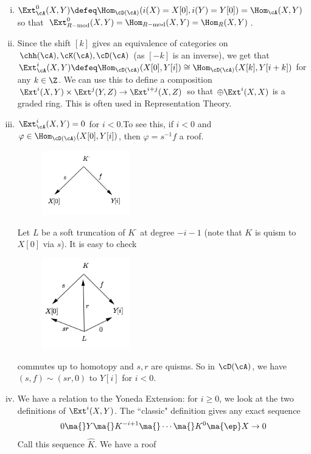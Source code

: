 \begin{rem}
\begin{enumerate}[(i)]
\item $\Ext_{\cA}^0(X,Y)\defeq \Hom_{\cD(\cA)}(i(X)=X[0],i(Y)=Y[0])=\Hom_{\cA}(X,Y)$ so that $\Ext_{R-\text{mod}}^0(X,Y)=\Hom_{R-\text{mod}}(X,Y)=\Hom_R(X,Y)$.
\item Since the shift $[k]$ gives an equivalence of categories on $\chh(\cA),\cK(\cA),\cD(\cA)$ (as $[-k]$ is an inverse), we get that $\Ext_{\cA}^i(X,Y)\defeq \Hom_{\cD(\cA)}(X[0],Y[i])\cong \Hom_{\cD(\cA)}(X[k],Y[i+k])$ for any $k \in \Z$. We can use this to define a composition $\Ext^i(X,Y) \times \Ext^j(Y,Z) \to \Ext^{i+j}(X,Z)$ so that $\oplus \Ext^i(X,X)$ is a graded ring. This is often used in Representation Theory.
\item $\Ext_{\cA}^i(X,Y)=0$ for $i<0$.To see this, if $i<0$ and $\varphi \in \Hom_{\cD(\cA)}(X[0],Y[i])$, then $\varphi=s^{-1}f$ a roof. 

\begin{figure}[H] 
   \centering
   \includegraphics[width=1.5in]{images/p12.png} 
\end{figure}

Let $L$ be a soft truncation of $K^\cdot$ at degree $-i-1$ (note that $K$ is quism to $X[0]$ via $s$). It is easy to check

\begin{figure}[H] 
   \centering
   \includegraphics[width=1.5in]{images/p13.png} 
\end{figure}

commutes up to homotopy and $s,r$ are quisms. So in $\cD(\cA)$, we have $(s,f) \sim (sr,0)$ to $Y[i]$ for $i<0$. 

\item We have a relation to the Yoneda Extension: for $i \geq 0$, we look at the two definitions of $\Ext^i(X,Y)$. The ``classic" definition gives any exact sequence
\[
0 \ma{} Y \ma{} K^{-i+1} \ma{} \cdots \ma{} K^0 \ma{\ep} X \to 0
\]
Call this sequence $\hat{K}$. We have a roof


\end{enumerate}
\end{rem}
